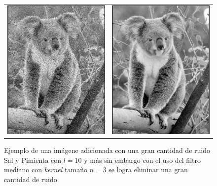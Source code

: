 		\begin{figure}[!h]
			\begin{tabular}{cc}
				\includegraphics[width=8.5cm]{Imagenes/Ruido_sp_10_.png} & \includegraphics[width=8.5cm]{Imagenes/Ruido_sp_10_mediana_3.png} \\
			\end{tabular}
			\label{Ruido_SP_Filtro_no_lineale_mediana}
			\caption{Ejemplo de una imágene adicionada con una gran cantidad de ruido Sal y Pimienta con $l = 10$ y más sin embargo con el uso del filtro mediano con \textit{kernel} tamaño $n=3$ se logra eliminar una gran cantidad de ruido}
		\end{figure}
		
